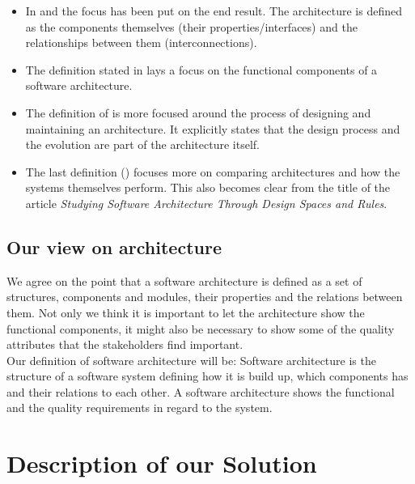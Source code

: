 \documentclass{article}
\begin{document}
\begin{itemize}
\item In \cite{clemens} and \cite{hayesroth} the focus has been put on the end result. The architecture is defined as the components themselves (their properties/interfaces) and the relationships between them (interconnections).
\item The definition stated in \cite{hayesroth} lays a focus on the functional components of a software architecture.
\item The definition of \cite{IEEE1471} is more focused around the process of
designing and maintaining an architecture. It explicitly states that the design
process and the evolution are part of the architecture itself.
\item The last definition (\cite{lane90}) focuses more on comparing
architectures and how the systems themselves perform. This also becomes clear
from the title of the article \emph{Studying Software Architecture Through
Design Spaces and Rules}.

\end{itemize}

\subsection{Our view on architecture}

We agree on the point that a software architecture is defined as a set of
structures, components and modules, their properties and the relations
between them. 
Not only we think it is important to let the architecture show the functional components, it might also be necessary to show some of the quality attributes that the stakeholders find important. \\ 

Our definition of software architecture will be:
Software architecture is the structure of a software system defining how it is
build up, which components has and their relations to each other. 
A software architecture shows the functional and the quality requirements in
regard to the system.

\section{Description of our Solution}

\appendix
\end{document}
